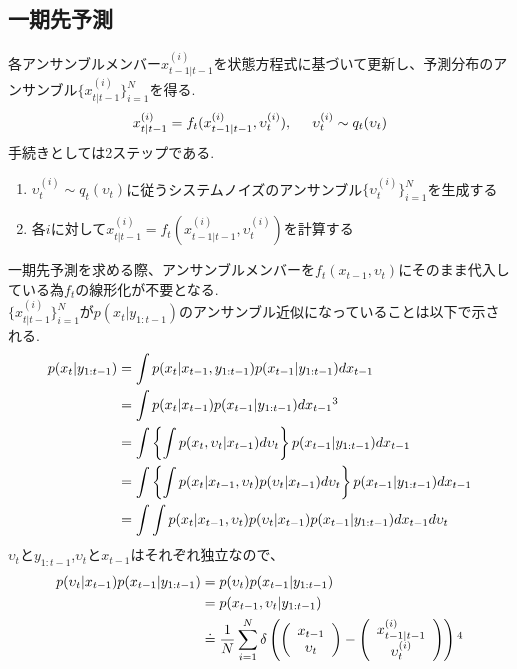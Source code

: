 \documentclass[dvipdfmx,uplatex,10pt]{jsarticle}
\begin{document}
\subsection{一期先予測}
各アンサンブルメンバー$x_{t-1|t-1}^{(i)}$を状態方程式に基づいて更新し、予測分布のアンサンブル$\{x_{t|t-1}^{(i)}\}_{i=1}^{N}$を得る.
\begin{align}
  x_{t|t-1}^{(i)}
  =f_{t}(x_{t-1|t-1}^{(i)},\upsilon_{t}^{(i)}),\hspace{0.5cm}\upsilon_{t}^{(i)}\sim q_{t}(\upsilon_{t})
\end{align}
手続きとしては2ステップである.
\begin{enumerate}
  \item $\upsilon_{t}^{(i)}\sim q_{t}(\upsilon_{t})$に従うシステムノイズのアンサンブル$\{\upsilon_{t}^{(i)}\}_{i=1}^{N}$を生成する
  \item 各$i$に対して$x_{t|t-1}^{(i)}=f_{t}(x_{t-1|t-1}^{(i)},\upsilon_{t}^{(i)})$を計算する
\end{enumerate}
一期先予測を求める際、アンサンブルメンバーを$f_{t}(x_{t-1},\upsilon_{t})$にそのまま代入している為$f_{t}$の線形化が不要となる.\\
$\{x_{t|t-1}^{(i)}\}_{i=1}^{N}$が$p(x_{t}|y_{1:t-1})$のアンサンブル近似になっていることは以下で示される.
\begin{align}
  p(x_{t}|y_{1:t-1})
  &=\int p(x_{t}|x_{t-1},y_{1:t-1})p(x_{t-1}|y_{1:t-1})dx_{t-1}\nonumber\\
  &=\int p(x_{t}|x_{t-1})p(x_{t-1}|y_{1:t-1})dx_{t-1}\footnotemark[3] \nonumber\\
  &=\int\left\{ \int p(x_{t},\upsilon_{t}|x_{t-1})d\upsilon_{t}\right\}p(x_{t-1}|y_{1:t-1})dx_{t-1}\nonumber\\
  &=\int\left\{ \int p(x_{t}|x_{t-1},\upsilon_{t})p(\upsilon_{t}|x_{t-1})d\upsilon_{t}\right\}p(x_{t-1}|y_{1:t-1})dx_{t-1}\nonumber\\
  &=\int \int p(x_{t}|x_{t-1},\upsilon_{t})p(\upsilon_{t}|x_{t-1})p(x_{t-1}|y_{1:t-1})dx_{t-1}d\upsilon_{t}
\end{align}
$\upsilon_{t}$と$y_{1:t-1}$,$\upsilon_{t}$と$x_{t-1}$はそれぞれ独立なので、
\begin{align}
  p(\upsilon_{t}|x_{t-1})p(x_{t-1}|y_{1:t-1})
  &=p(\upsilon_{t})p(x_{t-1}|y_{1:t-1})\nonumber\\
  &=p(x_{t-1},\upsilon_{t}|y_{1:t-1})\nonumber\\
  &\doteq \frac{1}{N}\sum_{i=1}^{N}\delta\left(
	\left(
\begin{array}{c}
  x_{t-1}\\
  \upsilon_{t}
\end{array}
  \right)
  -\left(
	\begin{array}{c}
	x_{t-1|t-1}^{(i)}\\
	\upsilon_{t}^{(i)}
  \end{array}
  \right)
\right)\footnotemark[4]
\end{align}
\end{document}
